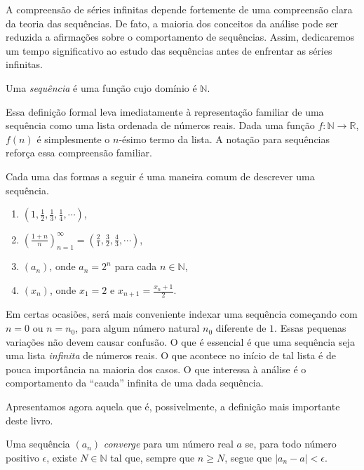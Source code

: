 A compreensão de séries infinitas depende fortemente de uma compreensão clara da teoria das sequências. De fato, a maioria dos conceitos da análise pode ser reduzida a afirmações sobre o comportamento de sequências. Assim, dedicaremos um tempo significativo ao estudo das sequências antes de enfrentar as séries infinitas.

\begin{definition}\label{def:sequencia}
Uma \textit{sequência} é uma função cujo domínio é $\mathbb{N}$.   
\end{definition}

Essa definição formal leva imediatamente à representação familiar de uma sequência como uma lista ordenada de números reais. Dada uma função $f \colon \mathbb{N} \to \mathbb{R}$, $f(n)$ é simplesmente o $n$-ésimo termo da lista. A notação para sequências reforça essa compreensão familiar.

\begin{example}\label{exmpl:2-2-2}
Cada uma das formas a seguir é uma maneira comum de descrever uma sequência.
\begin{enumerate}[label=(\roman*)]
\item $\left(1, \frac{1}{2}, \frac{1}{3}, \frac{1}{4}, \cdots\right)$,
\item $\left(\frac{1+n}{n}\right)_{n=1}^{\infty} = \left(\frac{2}{1}, \frac{3}{2}, \frac{4}{3}, \cdots\right)$,
\item $(a_n)$, onde $a_n = 2^n$ para cada $n \in \mathbb{N}$,
\item $(x_n)$, onde $x_1 = 2$ e $x_{n+1} = \frac{x_n+1}{2}$.
\end{enumerate}
\end{example}

Em certas ocasiões, será mais conveniente indexar uma sequência começando com $n = 0$ ou $n = n_0$, para algum número natural $n_0$ diferente de $1$. Essas pequenas variações não devem causar confusão. O que é essencial é que uma sequência seja uma lista \textit{infinita} de números reais. O que acontece no início de tal lista é de pouca importância na maioria dos casos. O que interessa à análise é o comportamento da ``cauda'' infinita de uma dada sequência. 

Apresentamos agora aquela que é, possivelmente, a definição mais importante deste livro.

\begin{definition}\label{def:convergencia-sequencia}
Uma sequência $(a_n)$ \textit{converge} para um número real $a$ se, para todo número positivo $\epsilon$, existe $N \in \mathbb{N}$ tal que, sempre que $n \geq N$, segue que $|a_n - a| < \epsilon$.   
\end{definition}

